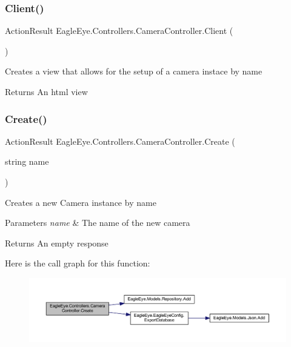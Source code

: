 \subsubsection{\texorpdfstring{Client()}{Client()}}
{\footnotesize\ttfamily Action\+Result Eagle\+Eye.\+Controllers.\+Camera\+Controller.\+Client (\begin{DoxyParamCaption}{ }\end{DoxyParamCaption})}



Creates a view that allows for the setup of a camera instace by name 

\begin{DoxyReturn}{Returns}
An html view
\end{DoxyReturn}
\mbox{\label{class_eagle_eye_1_1_controllers_1_1_camera_controller_a07c68e0e159c17b1725489ddf54f9f1d}} 
\subsubsection{\texorpdfstring{Create()}{Create()}}
{\footnotesize\ttfamily Action\+Result Eagle\+Eye.\+Controllers.\+Camera\+Controller.\+Create (\begin{DoxyParamCaption}\item[{string}]{name }\end{DoxyParamCaption})}



Creates a new Camera instance by name 


\begin{DoxyParams}{Parameters}
{\em name} & The name of the new camera\\
\hline
\end{DoxyParams}
\begin{DoxyReturn}{Returns}
An empty response
\end{DoxyReturn}
Here is the call graph for this function\+:\nopagebreak
\begin{figure}[H]
\begin{center}
\leavevmode
\includegraphics[width=350pt]{class_eagle_eye_1_1_controllers_1_1_camera_controller_a07c68e0e159c17b1725489ddf54f9f1d_cgraph}
\end{center}
\end{figure}
\mbox{\label{class_eagle_eye_1_1_controllers_1_1_camera_controller_ade4d5c697769c79b1866f95bbf7fc889}} 
